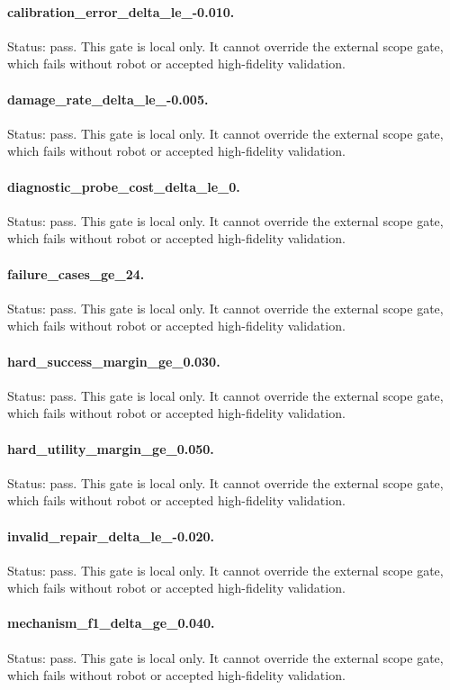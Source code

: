 \documentclass{article}
\begin{document}
\paragraph{calibration\_error\_delta\_le\_-0.010.} Status: pass. This gate is local only. It cannot override the external scope gate, which fails without robot or accepted high-fidelity validation.
\paragraph{damage\_rate\_delta\_le\_-0.005.} Status: pass. This gate is local only. It cannot override the external scope gate, which fails without robot or accepted high-fidelity validation.
\paragraph{diagnostic\_probe\_cost\_delta\_le\_0.} Status: pass. This gate is local only. It cannot override the external scope gate, which fails without robot or accepted high-fidelity validation.
\paragraph{failure\_cases\_ge\_24.} Status: pass. This gate is local only. It cannot override the external scope gate, which fails without robot or accepted high-fidelity validation.
\paragraph{hard\_success\_margin\_ge\_0.030.} Status: pass. This gate is local only. It cannot override the external scope gate, which fails without robot or accepted high-fidelity validation.
\paragraph{hard\_utility\_margin\_ge\_0.050.} Status: pass. This gate is local only. It cannot override the external scope gate, which fails without robot or accepted high-fidelity validation.
\paragraph{invalid\_repair\_delta\_le\_-0.020.} Status: pass. This gate is local only. It cannot override the external scope gate, which fails without robot or accepted high-fidelity validation.
\paragraph{mechanism\_f1\_delta\_ge\_0.040.} Status: pass. This gate is local only. It cannot override the external scope gate, which fails without robot or accepted high-fidelity validation.
\end{document}
